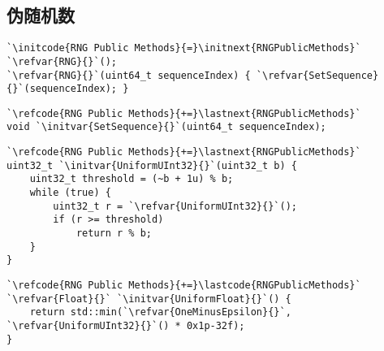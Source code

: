 \subsection{伪随机数}\label{sub:伪随机数}
{}
\begin{lstlisting}
`\initcode{RNG Public Methods}{=}\initnext{RNGPublicMethods}`
`\refvar{RNG}{}`();
`\refvar{RNG}{}`(uint64_t sequenceIndex) { `\refvar{SetSequence}{}`(sequenceIndex); }
\end{lstlisting}

\begin{lstlisting}
`\refcode{RNG Public Methods}{+=}\lastnext{RNGPublicMethods}`
void `\initvar{SetSequence}{}`(uint64_t sequenceIndex);
\end{lstlisting}

\begin{lstlisting}
`\refcode{RNG Public Methods}{+=}\lastnext{RNGPublicMethods}`
uint32_t `\initvar{UniformUInt32}{}`(uint32_t b) {
    uint32_t threshold = (~b + 1u) % b;
    while (true) {
        uint32_t r = `\refvar{UniformUInt32}{}`();
        if (r >= threshold)
            return r % b;
    }
}
\end{lstlisting}

\begin{lstlisting}
`\refcode{RNG Public Methods}{+=}\lastcode{RNGPublicMethods}`
`\refvar{Float}{}` `\initvar{UniformFloat}{}`() {
    return std::min(`\refvar{OneMinusEpsilon}{}`, `\refvar{UniformUInt32}{}`() * 0x1p-32f);
}
\end{lstlisting}
